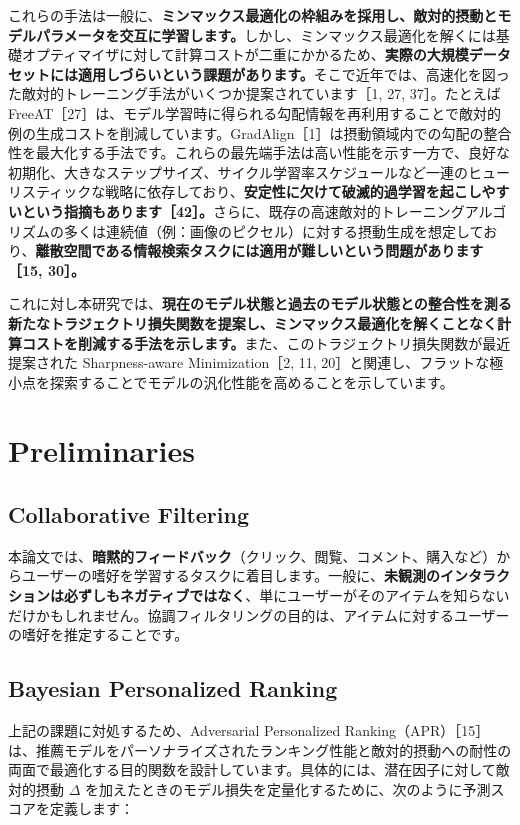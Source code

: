 \documentclass[11pt,a4paper]{article}
\begin{document}
これらの手法は一般に、\textbf{ミンマックス最適化の枠組みを採用し、敵対的摂動とモデルパラメータを交互に学習します。}しかし、ミンマックス最適化を解くには基礎オプティマイザに対して計算コストが二重にかかるため、\textbf{実際の大規模データセットには適用しづらいという課題があります。}そこで近年では、高速化を図った敵対的トレーニング手法がいくつか提案されています［1, 27, 37］。たとえば FreeAT［27］は、モデル学習時に得られる勾配情報を再利用することで敵対的例の生成コストを削減しています。GradAlign［1］は摂動領域内での勾配の整合性を最大化する手法です。これらの最先端手法は高い性能を示す一方で、良好な初期化、大きなステップサイズ、サイクル学習率スケジュールなど一連のヒューリスティックな戦略に依存しており、\textbf{安定性に欠けて破滅的過学習を起こしやすいという指摘もあります［42］。}さらに、既存の高速敵対的トレーニングアルゴリズムの多くは連続値（例：画像のピクセル）に対する摂動生成を想定しており、\textbf{離散空間である情報検索タスクには適用が難しいという問題があります［15, 30］。}

これに対し本研究では、\textbf{現在のモデル状態と過去のモデル状態との整合性を測る新たなトラジェクトリ損失関数を提案し、ミンマックス最適化を解くことなく計算コストを削減する手法を示します。}また、このトラジェクトリ損失関数が最近提案された Sharpness-aware Minimization［2, 11, 20］と関連し、フラットな極小点を探索することでモデルの汎化性能を高めることを示しています。

\section{Preliminaries}

\subsection{Collaborative Filtering}

本論文では、\textbf{暗黙的フィードバック}（クリック、閲覧、コメント、購入など）からユーザーの嗜好を学習するタスクに着目します。一般に、\textbf{未観測のインタラクションは必ずしもネガティブではなく}、単にユーザーがそのアイテムを知らないだけかもしれません。協調フィルタリングの目的は、アイテムに対するユーザーの嗜好を推定することです。

\subsection{Bayesian Personalized Ranking}

上記の課題に対処するため、Adversarial Personalized Ranking（APR）［15］は、推薦モデルをパーソナライズされたランキング性能と敵対的摂動への耐性の両面で最適化する目的関数を設計しています。具体的には、潜在因子に対して敵対的摂動 $\Delta$ を加えたときのモデル損失を定量化するために、次のように予測スコアを定義します：
\end{document}
